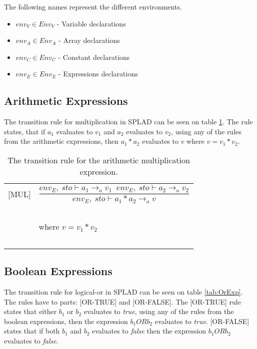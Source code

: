 The following names represent the different environments. 
\begin{itemize}
\item $env_V \in Env_V$ - Variable declarations
\item $env_A \in Env_A$ - Array declarations
\item $env_C \in Env_C$ - Constant declarations
\item $env_E \in Env_E$ - Expressions declarations
\end{itemize}

\subsection{Arithmetic Expressions}
The transition rule for multiplication in SPLAD can be seen on table \ref{tab:MultExp}. The rule states, that if $a_1$ evaluates to $v_1$ and $a_2$ evaluates to $v_2$, using any of the rules from the arithmetic expressions, then $a_1 * a_2$ evaluates to $v$ where $v = v_1 * v_2$.

\begin{table}[!H]
\begin{tabular}{l l}
[MUL] & \[\frac{env_E, \: sto \vdash a_1 \rightarrow_a v_1 \;\; env_E, \: sto \vdash a_2 \rightarrow_a v_2}{env_E, \: sto \vdash a_1 * a_2 \rightarrow_a v}\] \\
~ & ~ \\
~ & \indent\indent where $v=v_1 * v_2$ \\ 
~ & ~ \\
\end{tabular}
\caption{The transition rule for the arithmetic multiplication expression.}
\label{tab:MultExp}
\end{table}

\subsection{Boolean Expressions}
The transition rule for logical-or in SPLAD can be seen on table \ref{tab:OrExp}. The rules have to parts: [OR-TRUE] and [OR-FALSE]. The [OR-TRUE] rule states that either $b_1$ or $b_2$ evaluates to \textit{true}, using any of the rules from the boolean expressions, then the expression $b_1 OR b_2$ evaluates to \textit{true}. [OR-FALSE] states that if both $b_1$ and $b_2$ evaluates to \textit{false} then the expression $b_1 OR b_2$ evaluates to \textit{false}.

